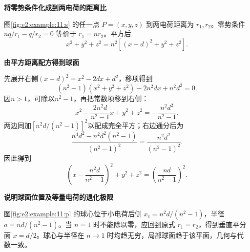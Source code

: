 \begin{solution}\textbf{将零势条件化成到两电荷的距离比}\par\nobreak
图\ref{fig:e2:example:11:s} 的任一点 $P=(x,y,z)$ 到两电荷距离为 $r_1,r_2$。零势条件 $nq/r_1-q/r_2=0$ 等价于 $r_1=nr_2$。平方后
\[
 x^2+y^2+z^2=n^2[(x-d)^2+y^2+z^2].
\]


\par\medskip{}\noindent\textbf{由平方距离配方得到球面}\par\nobreak
先展开右侧$(x-d)^2=x^2-2dx+d^2$，移项得到
\[
(n^2-1)(x^2+y^2+z^2)-2n^2dx+n^2d^2=0.
\]
因$n>1$，可除以$n^2-1$，再把常数项移到右侧：
\[
x^2-\frac{2n^2d}{n^2-1}x+y^2+z^2
=-\frac{n^2d^2}{n^2-1}.
\]
两边同加$[n^2d/(n^2-1)]^2$以配成完全平方；右边通分后为
\[
\frac{n^4d^2-n^2d^2(n^2-1)}{(n^2-1)^2}
=\frac{n^2d^2}{(n^2-1)^2}.
\]
因此得到
\[
 \left(x-\frac{n^2d}{n^2-1}\right)^2+y^2+z^2
 =\left(\frac{nd}{n^2-1}\right)^2.
\]



\par\medskip{}\noindent\textbf{说明球面位置及等量电荷的退化极限}\par\nobreak
图\ref{fig:e2:example:11:p} 的球心位于小电荷后侧 $x_c=n^2d/(n^2-1)$，半径 $a=nd/(n^2-1)$。当 $n=1$ 时不能除以零，应回到原式 $r_1=r_2$，得到垂直平分面 $x=d/2$。球心与半径在 $n\to1$ 时均趋无穷，局部球面趋于该平面，几何与代数一致。\end{solution}
